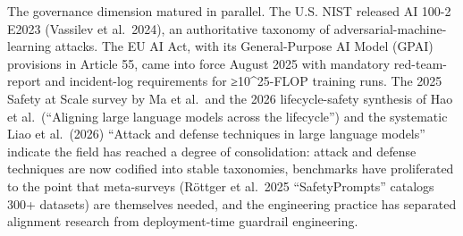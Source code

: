 \documentclass{article}
\begin{document}
The governance dimension matured in parallel. The U.S. NIST released AI 100-2 E2023 (Vassilev et al.~2024), an authoritative taxonomy of adversarial-machine-learning attacks. The EU AI Act, with its General-Purpose AI Model (GPAI) provisions in Article 55, came into force August 2025 with mandatory red-team-report and incident-log requirements for ≥10\^{}25-FLOP training runs. The 2025 Safety at Scale survey by Ma et al.~and the 2026 lifecycle-safety synthesis of Hao et al.~(``Aligning large language models across the lifecycle'') and the systematic Liao et al.~(2026) ``Attack and defense techniques in large language models'' indicate the field has reached a degree of consolidation: attack and defense techniques are now codified into stable taxonomies, benchmarks have proliferated to the point that meta-surveys (Röttger et al.~2025 ``SafetyPrompts'' catalogs 300+ datasets) are themselves needed, and the engineering practice has separated alignment research from deployment-time guardrail engineering.
\end{document}

